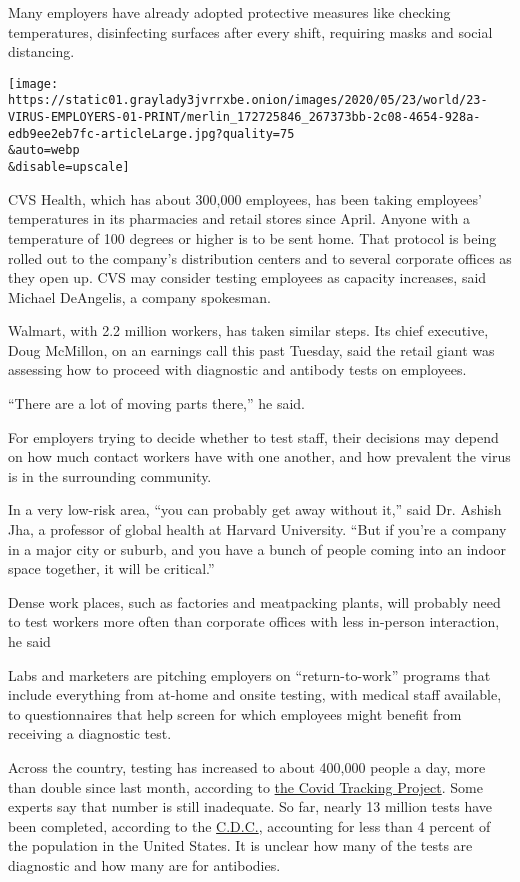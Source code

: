 Many employers have already adopted protective measures like checking
temperatures, disinfecting surfaces after every shift, requiring masks
and social distancing.

\texttt{[image: https://static01.graylady3jvrrxbe.onion/images/2020/05/23/world/23-VIRUS-EMPLOYERS-01-PRINT/merlin\_172725846\_267373bb-2c08-4654-928a-edb9ee2eb7fc-articleLarge.jpg?quality=75\\\&auto=webp\\\&disable=upscale]}

CVS Health, which has about 300,000 employees, has been taking
employees' temperatures in its pharmacies and retail stores since April.
Anyone with a temperature of 100 degrees or higher is to be sent home.
That protocol is being rolled out to the company's distribution centers
and to several corporate offices as they open up. CVS may consider
testing employees as capacity increases, said Michael DeAngelis, a
company spokesman.

Walmart, with 2.2 million workers, has taken similar steps. Its chief
executive, Doug McMillon, on an earnings call this past Tuesday, said
the retail giant was assessing how to proceed with diagnostic and
antibody tests on employees.

``There are a lot of moving parts there,'' he said.

For employers trying to decide whether to test staff, their decisions
may depend on how much contact workers have with one another, and how
prevalent the virus is in the surrounding community.

In a very low-risk area, ``you can probably get away without it,'' said
Dr. Ashish Jha, a professor of global health at Harvard University.
``But if you're a company in a major city or suburb, and you have a
bunch of people coming into an indoor space together, it will be
critical.''

Dense work places, such as factories and meatpacking plants, will
probably need to test workers more often than corporate offices with
less in-person interaction, he said

Labs and marketers are pitching employers on ``return-to-work'' programs
that include everything from at-home and onsite testing, with medical
staff available, to questionnaires that help screen for which employees
might benefit from receiving a diagnostic test.

Across the country, testing has increased to about 400,000 people a day,
more than double since last month, according to
\href{https://covidtracking.com/}{the Covid Tracking Project}. Some
experts say that number is still inadequate. So far, nearly 13 million
tests have been completed, according to the
\href{https://www.nytimes3xbfgragh.onion/2020/05/22/health/Coronavirus-touching-surfaces.html}{C.D.C.},
accounting for less than 4 percent of the population in the United
States. It is unclear how many of the tests are diagnostic and how many
are for antibodies.

